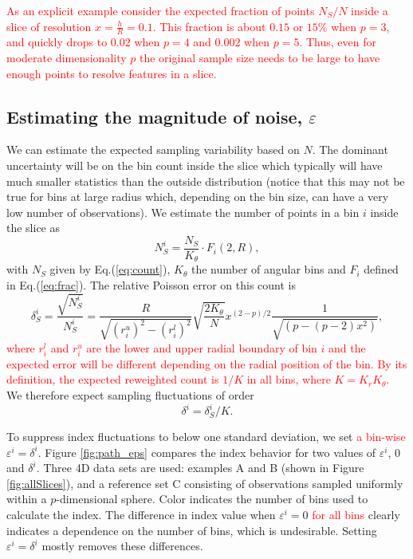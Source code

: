 \documentclass[]{interact}
\theoremstyle{plain}%
\theoremstyle{definition}
\theoremstyle{remark}
\begin{document}
\textcolor{red}{As an explicit example consider the expected fraction of points $N_S/N$ inside a slice of resolution $x=\frac{h}{R}=0.1$. This fraction is about $0.15$ or $15\%$ when $p=3$, and quickly drops to $0.02$ when $p=4$ and $0.002$ when $p=5$. Thus, even for moderate dimensionality $p$ the original sample size needs to be large to have enough points to resolve features in a slice.}

\hypertarget{estimating-the-magnitude-of-noise-varepsilon}{%
\subsection{\texorpdfstring{Estimating the magnitude of noise,
\(\varepsilon\)
\label{sec:epsilon}}{Estimating the magnitude of noise, \textbackslash varepsilon }}\label{estimating-the-magnitude-of-noise-varepsilon}}

We can estimate the expected sampling variability based on \(N\). The
dominant uncertainty will be on the bin count inside the slice which
typically will have much smaller statistics than the outside
distribution (notice that this may not be true for bins at large radius
which, depending on the bin size, can have a very low number of
observations). We estimate the number of points in a bin \(i\) inside
the slice as \begin{equation}
N_S^i = \frac{N_S}{K_{\theta}} \cdot F_i(2, R),
\end{equation} with \(N_S\) given by Eq.(\ref{eq:count}), \(K_{\theta}\)
the number of angular bins and \(F_i\) defined in Eq.(\ref{eq:frac}).
The relative Poisson error on this count is \begin{equation}
\delta_S^i = \frac{\sqrt{N_S^i}}{N_S^i} = 
\frac{R}{\sqrt{(r_i^u)^2 - (r_i^l)^2}} \sqrt{\frac{2 K_{\theta}}{N}} x^{(2-p)/2}
\frac{1}{\sqrt{\left(p - (p-2) x^{2}\right)}}, 
\end{equation}
\textcolor{red}{where $r_i^l$ and $r_i^u$ are the lower and upper radial boundary of bin $i$ and the expected error will be different depending on the radial position of the bin. By its definition, the expected reweighted count is $1/K$ in all bins, where $K=K_r K_{\theta}$.}
We therefore expect sampling fluctuations of order \begin{equation}
\delta^i = \delta_S^i / K. 
\label{eq:eps}
\end{equation}

To suppress index fluctuations to below one standard deviation, we set
\textcolor{red}{a bin-wise} \(\varepsilon^i = \delta^i\). Figure
\ref{fig:path_eps} compares the index behavior for two values of
\(\varepsilon^i\), \(0\) and \(\delta^i\). Three 4D data sets are used:
examples A and B (shown in Figure \ref{fig:allSlices}), and a reference
set C consisting of observations sampled uniformly within a
\(p\)-dimensional sphere. Color indicates the number of bins used to
calculate the index. The difference in index value when
\(\varepsilon^i=0\) \textcolor{red}{for all bins} clearly indicates a
dependence on the number of bins, which is undesirable. Setting
\(\varepsilon^i = \delta^i\) mostly removes these differences.
\end{document}
